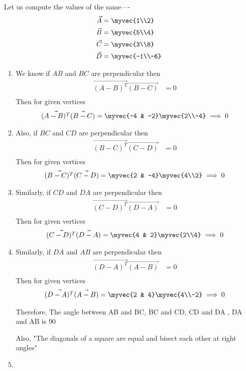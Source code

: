 \documentclass[journal,12pt,twocolumn]{IEEEtran}
\begin{document}
Let us compute the values of the same----
\begin{align}
\vec {A} &=\myvec {1\\2}\\
\vec {B}&=\myvec {5\\4}\\
\vec {C}&=\myvec {3\\8}\\
\vec {D}&=\myvec {-1\\-6}
\end{align}
\begin{enumerate}
\item
We know if $AB$ and $BC$ are perpendicular then
\begin{align}
\vec{(A-B)^T}\vec{(B-C)}&=0\\
\end{align}
Then for given vertices 
\begin{align}
\vec{(A-B)^T}\vec{(B-C)}=\myvec {-4 & -2}\myvec {2\\-4}\implies 0
\end{align}
\item
Also, if $BC$ and $CD$ are perpendicular then
\begin{align}
\vec{(B-C)^T}\vec{(C-D)}&=0\\
\end{align}
Then for given vertices 
\begin{align}
\vec{(B-C)^T}\vec{(C-D)}=\myvec {2 & -4}\myvec {4\\2}\implies 0
\end{align}
\item 
Similarly, if $CD$ and $DA$ are perpendicular then
\begin{align}
\vec{(C-D)^T}\vec{(D-A)}&=0\\
\end{align}
Then for given vertices 
\begin{align}
\vec{(C-D)^T}\vec{(D-A)}=\myvec {4 & 2}\myvec {2\\4}\implies 0
\end{align}


\item
Similarly, if $DA$ and $AB$ are perpendicular then
\begin{align}
\vec{(D-A)^T}\vec{(A-B)}&=0\\
\end{align}
Then for given vertices 
\begin{align}
\vec{(D-A)^T}\vec{(A-B)}=\myvec {2 & 4}\myvec {4\\-2}\implies 0
\end{align}

Therefore, The angle between AB and BC, BC and CD, CD and DA , DA and AB is 90\degree

Also, "The diagonals of a square are equal and bisect each other at right angles"



\item 
\end{enumerate}
\end{document}
